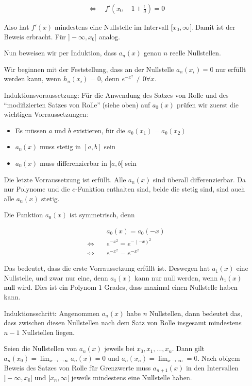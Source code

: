 \documentclass[a4paper,german,12pt,smallheadings]{scrartcl}
\begin{document}
\begin{align*}
  \Leftrightarrow\quad f'\left(x_0 - 1 + \frac{1}{d}\right) = 0
\end{align*}

Also hat $f'(x)$ mindestens eine Nullstelle im Intervall $[x_0, \infty[$. Damit
ist der Beweis erbracht. Für $]-\infty, x_0]$ analog.

Nun beweisen wir per Induktion, dass $a_n(x)$ genau $n$ reelle Nullstellen.

Wir beginnen mit der Feststellung, dass an der Nullstelle $a_n(x_i) = 0$ nur
erfüllt werden kann, wenn $h_n(x_i) = 0$, denn $e^{-x^2} \neq 0 \forall x$.

Induktionsvoraussetzung: Für die Anwendung des Satzes von Rolle und des
``modifizierten Satzes von Rolle'' (siehe oben) auf $a_0(x)$ prüfen wir zuerst
die wichtigen Vorraussetzungen:

\begin{itemize}
  \item Es müssen $a$ und $b$ existieren, für die $a_0(x_1) = a_0(x_2)$
  \item $a_0(x)$ muss stetig in $[a,b]$ sein
  \item $a_0(x)$ muss differenzierbar in $]a,b[$ sein
\end{itemize}

Die letzte Vorraussetzung ist erfüllt. Alle $a_n(x)$ sind überall
differenzierbar. Da nur Polynome und die $e$-Funktion enthalten sind, beide die
stetig sind, sind auch alle $a_n(x)$ stetig.

Die Funktion $a_0(x)$ ist symmetrisch, denn

\begin{align*}
  &a_0(x) = a_0(-x) \\
  \Leftrightarrow\quad &e^{-x^2} = e^{-(-x)^2} \\
  \Leftrightarrow\quad &e^{-x^2} = e^{-x^2}
\end{align*}

Das bedeutet, dass die erste Vorraussetzung erfüllt ist. Deswegen hat $a_1(x)$
eine Nullstelle, und zwar nur eine, denn $a_1(x)$ kann nur null werden, wenn
$h_1(x)$ null wird. Dies ist ein Polynom $1$ Grades, dass maximal einen
Nullstelle haben kann.

Induktionsschritt: Angenommen $a_n(x)$ habe $n$ Nullstellen, dann bedeutet das,
dass zwischen diesen Nullstellen nach dem Satz von Rolle insgesamt mindestens $n-1$
Nullstellen liegen.

Seien die Nullstellen von $a_n(x)$ jeweils bei $x_0, x_1, \dots, x_n$. Dann
gilt $a_n(x_0) = \lim_{x \to -\infty} a_n(x) = 0$ und $a_n(x_n) = \lim_{x \to
\infty} = 0$. Nach obigem Beweis des Satzes von Rolle für Grenzwerte muss $a_{n+1}(x)$
in den Intervallen $]-\infty,x_0]$ und $[x_n,\infty[$ jeweils mindestens eine
Nullstelle haben.
\end{document}
